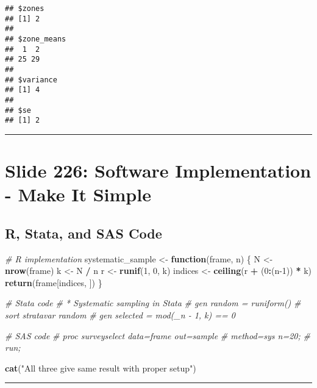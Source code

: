 \documentclass[
]{article}
\newenvironment{Shaded}{\begin{snugshade}}{\end{snugshade}}
\newcommand{\CommentTok}[1]{\textcolor[rgb]{0.56,0.35,0.01}{\textit{#1}}}
\newcommand{\ControlFlowTok}[1]{\textcolor[rgb]{0.13,0.29,0.53}{\textbf{#1}}}
\newcommand{\DecValTok}[1]{\textcolor[rgb]{0.00,0.00,0.81}{#1}}
\newcommand{\FunctionTok}[1]{\textcolor[rgb]{0.13,0.29,0.53}{\textbf{#1}}}
\newcommand{\NormalTok}[1]{#1}
\newcommand{\OtherTok}[1]{\textcolor[rgb]{0.56,0.35,0.01}{#1}}
\newcommand{\SpecialCharTok}[1]{\textcolor[rgb]{0.81,0.36,0.00}{\textbf{#1}}}
\newcommand{\StringTok}[1]{\textcolor[rgb]{0.31,0.60,0.02}{#1}}
\begin{document}
\begin{verbatim}
## $zones
## [1] 2
## 
## $zone_means
##  1  2 
## 25 29 
## 
## $variance
## [1] 4
## 
## $se
## [1] 2
\end{verbatim}

\begin{center}\rule{0.5\linewidth}{0.5pt}\end{center}

\section{Slide 226: Software Implementation - Make It
Simple}\label{slide-226-software-implementation---make-it-simple}

\subsection{R, Stata, and SAS Code}\label{r-stata-and-sas-code}

\begin{Shaded}
\begin{Highlighting}[]
\CommentTok{\# R implementation}
\NormalTok{systematic\_sample }\OtherTok{\textless{}{-}} \ControlFlowTok{function}\NormalTok{(frame, n) \{}
\NormalTok{  N }\OtherTok{\textless{}{-}} \FunctionTok{nrow}\NormalTok{(frame)}
\NormalTok{  k }\OtherTok{\textless{}{-}}\NormalTok{ N }\SpecialCharTok{/}\NormalTok{ n}
\NormalTok{  r }\OtherTok{\textless{}{-}} \FunctionTok{runif}\NormalTok{(}\DecValTok{1}\NormalTok{, }\DecValTok{0}\NormalTok{, k)}
\NormalTok{  indices }\OtherTok{\textless{}{-}} \FunctionTok{ceiling}\NormalTok{(r }\SpecialCharTok{+}\NormalTok{ (}\DecValTok{0}\SpecialCharTok{:}\NormalTok{(n}\DecValTok{{-}1}\NormalTok{)) }\SpecialCharTok{*}\NormalTok{ k)}
  \FunctionTok{return}\NormalTok{(frame[indices, ])}
\NormalTok{\}}

\CommentTok{\# Stata code}
\CommentTok{\# * Systematic sampling in Stata}
\CommentTok{\# gen random = runiform()}
\CommentTok{\# sort stratavar random}
\CommentTok{\# gen selected = mod(\_n {-} 1, k) == 0}

\CommentTok{\# SAS code}
\CommentTok{\# proc surveyselect data=frame out=sample}
\CommentTok{\#   method=sys n=20;}
\CommentTok{\# run;}

\FunctionTok{cat}\NormalTok{(}\StringTok{"All three give same result with proper setup"}\NormalTok{)}
\end{Highlighting}
\end{Shaded}

\begin{center}\rule{0.5\linewidth}{0.5pt}\end{center}
\end{document}
